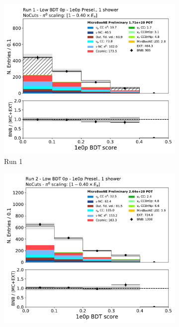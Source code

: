 \begin{figure}[H]
    \centering
    \begin{subfigure}{0.3\textwidth}
    \includegraphics[width=1.0\textwidth]{1e0p/Low_BDT_Sideband/run1/bkg_score_low_bdt.pdf}
    \caption{Run 1}
    \end{subfigure}
    \begin{subfigure}{0.3\textwidth}
    \includegraphics[width=1.0\textwidth]{1e0p/Low_BDT_Sideband/run2/bkg_score_low_bdt.pdf}

\end{subfigure}
\end{figure}

